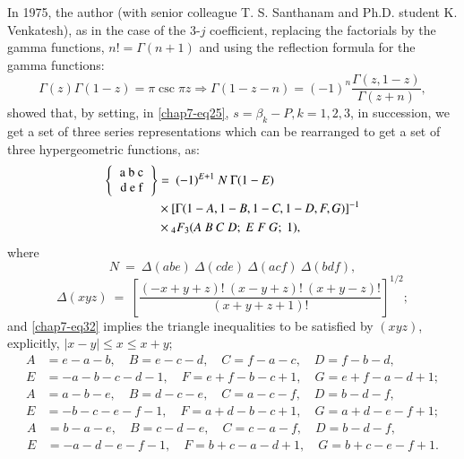 In 1975, the author (with senior colleague T. S. Santhanam and Ph.D. student K. Venkatesh), as in the case of the 3-$j$ coefficient, replacing the factorials by the gamma functions, $n! = \Gamma(n+1)$ and using the reflection formula for the gamma functions:
\begin{equation}
\Gamma(z)\Gamma(1-z) = \pi \csc \pi z \Rightarrow \Gamma(1-z-n)=(-1)^n \frac{\Gamma(z, 1-z)}{\Gamma(z+n)}, \label{chap7-eq29}
\end{equation}
showed that, by setting, in \eqref{chap7-eq25}, $s=\beta_k-P, k=1,2,3$, in succession, we get a set of three series representations which can be rearranged to get a set of three hypergeometric functions, as:
\begin{equation}
\begin{split}
\left\{ 
\begin{tabular} {c} 
a\ b\ c\\ d\ e\ f \\ \end{tabular} 
\right\} 
& =\ (-1)^{E+1}\ N\ \Gamma(1-E)\\
& \times [\Gamma(1-A, 1-B, 1-C, 1-D, F, G)]^{-1}\\
& \times {}_4F_3(A\ B\ C\ D;\ E\ F\ G;\ 1), \label{chap7-eq30}
\end{split}
\end{equation}
where
\begin{equation}
N\ =\ \Delta(abe)\ \Delta(cde)\ \Delta(acf)\ \Delta(bdf), \label{chap7-eq31}
\end{equation}
\begin{equation}
\Delta(xyz)\ =\  \left[ \frac{(-x+y+z)!\ (x-y+z)!\ (x+y-z)!}{(x+y+z+1)!} \right]^{1/2}; \label{chap7-eq32}
\end{equation}
and \eqref{chap7-eq32} implies the triangle inequalities to be satisfied by $(xyz)$, explicitly, $|x-y| \leq x \leq x+y$; 
{\fontsize{9.5pt}{11pt}\selectfont
\begin{equation}
\begin{split}
A & = e-a-b, \quad B=e-c-d, \quad C=f-a-c, \quad D=f-b-d,\\
E & = -a-b-c-d-1, \quad F=e+f-b-c+1, \quad G=e+f-a-d+1;\label{chap7-eq33}
\end{split}
\end{equation}
\begin{equation}
\begin{split}
A & = a-b-e, \quad B=d-c-e, \quad C=a-c-f, \quad D=b-d-f,\\
E & = -b-c-e-f-1, \quad F=a+d-b-c+1, \quad G=a+d-e-f+1; \label{chap7-eq34}
\end{split}
\end{equation}
\begin{equation}
\begin{split}
A & = b-a-e, \quad B=c-d-e, \quad C=c-a-f, \quad D=b-d-f,\\
E & = -a-d-e-f-1, \quad F=b+c-a-d+1, \quad G=b+c-e-f+1. \label{chap7-eq35}
\end{split}
\end{equation}}\relax

